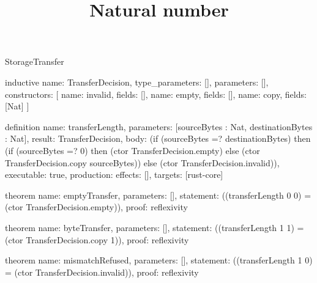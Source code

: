 \begin{lexlean}{StorageTransfer}
\title{Natural number}
\begin{semanticmodule}
inductive{
  name: TransferDecision,
  type_parameters: [],
  parameters: [],
  constructors: [
    {name: invalid, fields: []},
    {name: empty, fields: []},
    {name: copy, fields: [Nat]}
  ]
}

definition{
  name: transferLength,
  parameters: [sourceBytes : Nat, destinationBytes : Nat],
  result: TransferDecision,
  body: (if (sourceBytes =? destinationBytes) then (if (sourceBytes =? 0) then (ctor TransferDecision.empty) else (ctor TransferDecision.copy sourceBytes)) else (ctor TransferDecision.invalid)),
  executable: true,
  production: {effects: [], targets: [rust-core]}
}

theorem{
  name: emptyTransfer,
  parameters: [],
  statement: ((transferLength 0 0) = (ctor TransferDecision.empty)),
  proof: reflexivity{}
}

theorem{
  name: byteTransfer,
  parameters: [],
  statement: ((transferLength 1 1) = (ctor TransferDecision.copy 1)),
  proof: reflexivity{}
}

theorem{
  name: mismatchRefused,
  parameters: [],
  statement: ((transferLength 1 0) = (ctor TransferDecision.invalid)),
  proof: reflexivity{}
}
\end{semanticmodule}
\end{lexlean}
